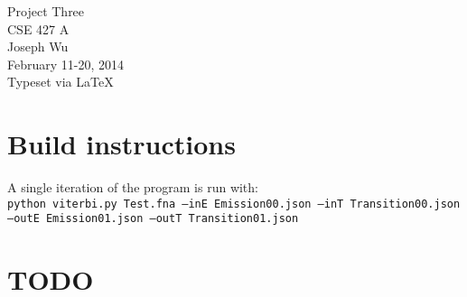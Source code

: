 \documentclass[a4paper, 12pt]{report}
\begin{document}
    \begin{center}
        {\LARGE Project Three} \\
        CSE 427 A \\
        Joseph Wu  \\
        February 11-20, 2014 \\
        {\tiny Typeset via \LaTeX}
    \end{center}

\section{Build instructions}
    A single iteration of the program is run with: \\
    \texttt{python viterbi.py Test.fna --inE Emission00.json --inT Transition00.json --outE Emission01.json --outT Transition01.json}

\section{TODO}
    
    
\end{document}
